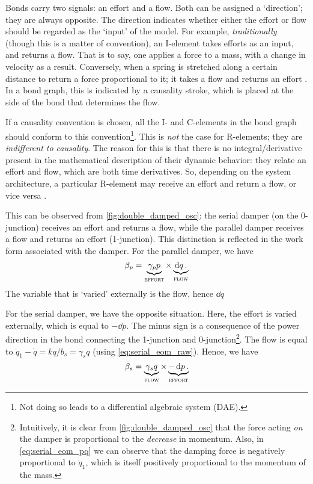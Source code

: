 Bonds carry two signals: an effort and a flow. Both can be assigned a `direction'; they are always opposite. The direction indicates whether either the effort or flow should be regarded as the `input' of the model. For example, \emph{traditionally} (though this is a matter of convention), an I-element takes efforts as an input, and returns a flow. That is to say, one applies a force to a mass, with a change in velocity as a result. Conversely, when a spring is stretched along a certain distance to return a force proportional to it; it takes a flow and returns an effort \cite{Borutzky2010}. In a bond graph, this is indicated by a causality stroke, which is placed at the side of the bond that determines the flow.

If a causality convention is chosen, all the I- and C-elements in the bond graph should conform to this convention\footnote{Not doing so leads to a differential algebraic system (DAE).}. This is \emph{not} the case for R-elements; they are \emph{indifferent to causality}. The reason for this is that there is no integral/derivative present in the mathematical description of their dynamic behavior: they relate an effort and flow, which are both time derivatives. So, depending on the system architecture, a particular R-element may receive an effort and return a flow, or vice versa \cite{Borutzky2010}.

This can be observed from \cref{fig:double_damped_osc}: the serial damper (on the 0-junction) receives an effort and returns a flow, while the parallel damper receives a flow and returns an effort (1-junction). This distinction is reflected in the work form associated with the damper. For the parallel damper, we have
\begin{equation}
     \beta_p = \underbrace{\gamma_p p}_\text{\textsc{effort}} \times \underbrace{\dd{q}.}_\text{\textsc{flow}}
\end{equation}
The variable that is `varied' externally is the flow, hence \(\dd{q}\) 

For the serial damper, we have the opposite situation. Here, the effort is varied externally, which is equal to \(-\dd{p}\). The minus sign is a consequence of the power direction in the bond connecting the 1-junction and 0-junction\footnote{Intuitively, it is clear from \cref{fig:double_damped_osc} that the force acting \emph{on} the damper is proportional to the \emph{decrease} in momentum. Also, in \cref{eq:serial_eom_pq} we can observe that the damping force is negatively proportional to \(\dot{q}_1\), which is itself positively proportional to the momentum of the mass.}. The flow is equal to \(\dot{q}_1 - \dot{q} = kq/b_s = \gamma_s q\) (using \cref{eq:serial_eom_raw}). Hence, we have
\begin{equation}
     \beta_s = \underbrace{\gamma_s q}_\text{\textsc{flow}} \times \underbrace{-\dd{p}.}_\text{\textsc{effort}}
\end{equation}

